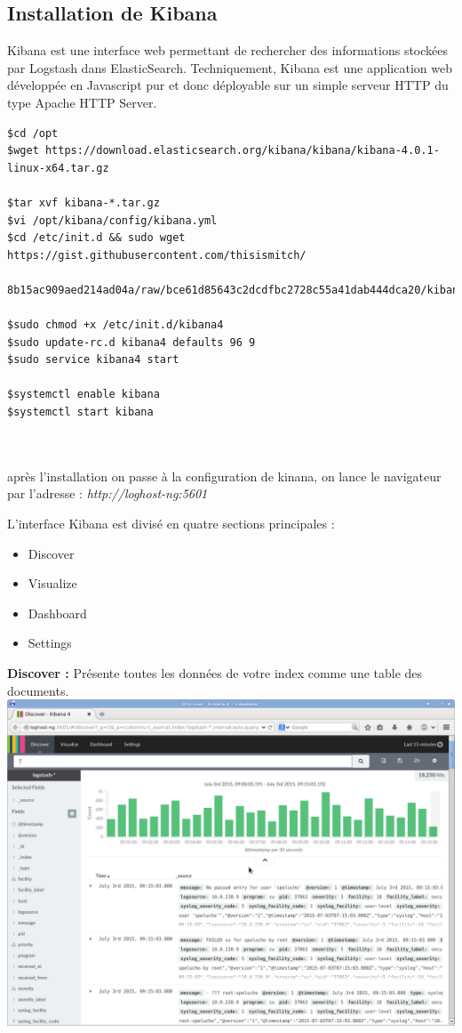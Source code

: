 \documentclass[11pt,a4paper]{article}
\begin{document}
\subsection{Installation de Kibana}
Kibana est une interface web permettant de rechercher des informations stockées par Logstash dans ElasticSearch.
Techniquement, Kibana est une application web développée en Javascript pur et donc déployable sur un simple serveur HTTP du type Apache HTTP Server.
\begin{verbatim}
$cd /opt
$wget https://download.elasticsearch.org/kibana/kibana/kibana-4.0.1-linux-x64.tar.gz

$tar xvf kibana-*.tar.gz
$vi /opt/kibana/config/kibana.yml
$cd /etc/init.d && sudo wget https://gist.githubusercontent.com/thisismitch/
 8b15ac909aed214ad04a/raw/bce61d85643c2dcdfbc2728c55a41dab444dca20/kibana4

$sudo chmod +x /etc/init.d/kibana4
$sudo update-rc.d kibana4 defaults 96 9
$sudo service kibana4 start

$systemctl enable kibana
$systemctl start kibana



\end{verbatim}

après l'installation on passe à la configuration de kinana, on lance le navigateur par l'adresse :  \textit{http://loghost-ng:5601}


L'interface Kibana est divisé en quatre sections principales :

\begin{itemize}
	\item Discover
	
    \item Visualize
    
    \item Dashboard
    
    \item Settings
    
\end{itemize}

\newpage

\textbf{Discover : }Présente toutes les données de votre index comme une table des documents.\\

\includegraphics[scale=0.3]{discover.png} \\
\end{document}
